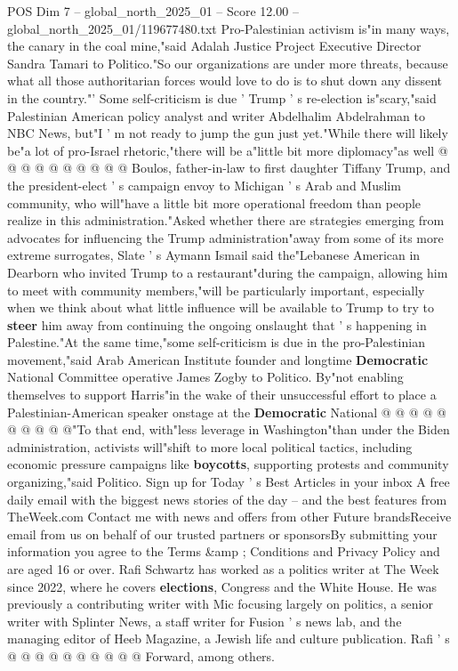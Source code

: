 \begin{textsample}{POS Dim 7 – global\_north\_2025\_01 – Score 12.00 – global\_north\_2025\_01/119677480.txt}
Pro-Palestinian activism is"in many ways, the canary in the coal mine,"said Adalah Justice Project Executive Director Sandra Tamari to Politico."So our organizations are under more threats, because what all those authoritarian forces would love to do is to shut down any dissent in the country."' Some self-criticism is due ' Trump ' s re-election is"scary,"said Palestinian American policy analyst and writer Abdelhalim Abdelrahman to NBC News, but"I ' m not ready to jump the gun just yet."While there will likely be"a lot of pro-Israel rhetoric,"there will be a"little bit more diplomacy"as well @ @ @ @ @ @ @ @ @ @ Boulos, father-in-law to first daughter Tiffany Trump, and the president-elect ' s campaign envoy to Michigan ' s Arab and Muslim community, who will"have a little bit more operational freedom than people realize in this administration."Asked whether there are strategies emerging from advocates for influencing the Trump administration"away from some of its more extreme surrogates, Slate ' s Aymann Ismail said the"Lebanese American in Dearborn who invited Trump to a restaurant"during the campaign, allowing him to meet with community members,"will be particularly important, especially when we think about what little influence will be available to Trump to try to \textbf{steer} him away from continuing the ongoing onslaught that ' s happening in Palestine."At the same time,"some self-criticism is due in the pro-Palestinian movement,"said Arab American Institute founder and longtime \textbf{Democratic} National Committee operative James Zogby to Politico.
By"not enabling themselves to support Harris"in the wake of their unsuccessful effort to place a Palestinian-American speaker onstage at the \textbf{Democratic} National @ @ @ @ @ @ @ @ @ @"To that end, with"less leverage in Washington"than under the Biden administration, activists will"shift to more local political tactics, including economic pressure campaigns like \textbf{boycotts}, supporting protests and community organizing,"said Politico.
Sign up for Today ' s Best Articles in your inbox A free daily email with the biggest news stories of the day -- and the best features from TheWeek.com Contact me with news and offers from other Future brandsReceive email from us on behalf of our trusted partners or sponsorsBy submitting your information you agree to the Terms \&amp ; Conditions and Privacy Policy and are aged 16 or over.
Rafi Schwartz has worked as a politics writer at The Week since 2022, where he covers \textbf{elections}, Congress and the White House.
He was previously a contributing writer with Mic focusing largely on politics, a senior writer with Splinter News, a staff writer for Fusion ' s news lab, and the managing editor of Heeb Magazine, a Jewish life and culture publication.
Rafi ' s @ @ @ @ @ @ @ @ @ @ Forward, among others.

\end{textsample}
